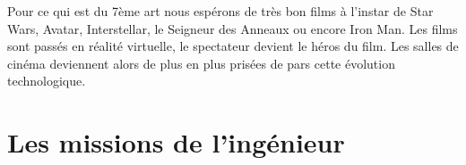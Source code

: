 Pour ce qui est du 7ème art nous espérons de très bon films à l'instar de Star Wars, Avatar, Interstellar, le Seigneur des Anneaux ou encore Iron Man. Les films sont passés en réalité virtuelle, le spectateur devient le héros du film. Les salles de cinéma deviennent alors de plus en plus prisées de pars cette évolution technologique.

\newpage
\section{Les missions de l’ingénieur}
%
%
%
%
%
% 
%
